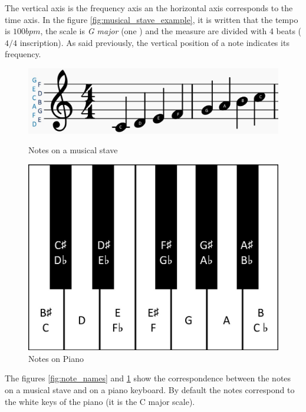 \documentclass[12pt]{report}
\begin{document}
The vertical axis is the frequency axis an the horizontal axis corresponds to the time axis.
In the figure \ref{fig:musical_stave_example}, it is written that the tempo is $100 bpm$, the scale is \textit{G major} (one \musSharp) and the measure are divided with 4 beats ($4/4$ inscription).
As said previously, the vertical position of a note indicates its frequency.

\begin{figure}[H]
   \begin{minipage}{0.5\textwidth}
     \centering
     \includegraphics[width=.9\linewidth]{images/music/stave/note_names.jpg}
     \caption{Notes on a musical stave}
     \label{fig:note_names}
   \end{minipage}\hfill
   \begin{minipage}{0.5\textwidth}
     \centering
     \includegraphics[width=.9\linewidth]{images/music/piano/piano_keys.jpg}
     \caption{Notes on Piano}
     \label{fig:piano_keys}
   \end{minipage}
\end{figure}

The figures \ref{fig:note_names} and \ref{fig:piano_keys} show the correspondence between the notes on a musical stave and on a piano keyboard.
By default the notes correspond to the white keys of the piano (it is the C major scale).
\end{document}
